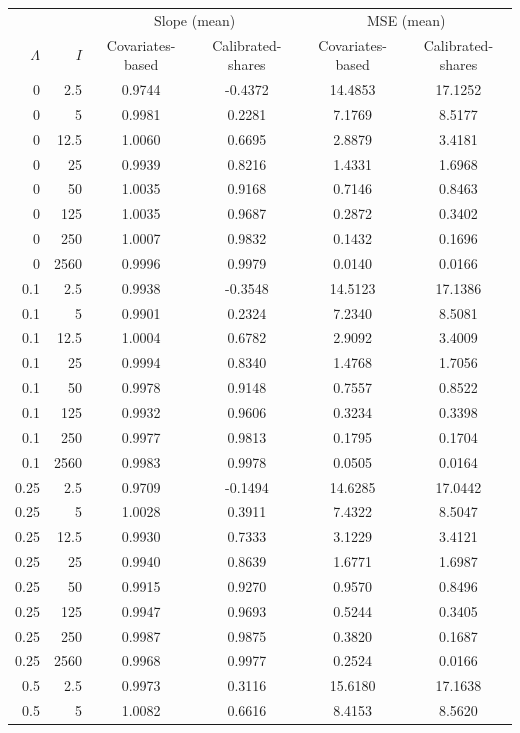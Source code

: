 \begin{tabular}{rrcccc}
\toprule
& & \multicolumn{2}{c}{Slope (mean)} & \multicolumn{2}{c}{MSE (mean)} \\
 $\Lambda$ & $I$ & Covariates-based & Calibrated-shares & Covariates-based & Calibrated-shares\\
\midrule
 0 & 2.5 & 0.9744 & -0.4372 & 14.4853 & 17.1252\\
0 & 5 & 0.9981 & 0.2281 & 7.1769 & 8.5177\\
0 & 12.5 & 1.0060 & 0.6695 & 2.8879 & 3.4181\\
0 & 25 & 0.9939 & 0.8216 & 1.4331 & 1.6968\\
0 & 50 & 1.0035 & 0.9168 & 0.7146 & 0.8463\\
0 & 125 & 1.0035 & 0.9687 & 0.2872 & 0.3402\\
0 & 250 & 1.0007 & 0.9832 & 0.1432 & 0.1696\\
0 & 2560 & 0.9996 & 0.9979 & 0.0140 & 0.0166\\
\midrule
0.1 & 2.5 & 0.9938 & -0.3548 & 14.5123 & 17.1386\\
0.1 & 5 & 0.9901 & 0.2324 & 7.2340 & 8.5081\\
0.1 & 12.5 & 1.0004 & 0.6782 & 2.9092 & 3.4009\\
0.1 & 25 & 0.9994 & 0.8340 & 1.4768 & 1.7056\\
0.1 & 50 & 0.9978 & 0.9148 & 0.7557 & 0.8522\\
0.1 & 125 & 0.9932 & 0.9606 & 0.3234 & 0.3398\\
0.1 & 250 & 0.9977 & 0.9813 & 0.1795 & 0.1704\\
0.1 & 2560 & 0.9983 & 0.9978 & 0.0505 & 0.0164\\
\midrule
0.25 & 2.5 & 0.9709 & -0.1494 & 14.6285 & 17.0442\\
0.25 & 5 & 1.0028 & 0.3911 & 7.4322 & 8.5047\\
0.25 & 12.5 & 0.9930 & 0.7333 & 3.1229 & 3.4121\\
0.25 & 25 & 0.9940 & 0.8639 & 1.6771 & 1.6987\\
0.25 & 50 & 0.9915 & 0.9270 & 0.9570 & 0.8496\\
0.25 & 125 & 0.9947 & 0.9693 & 0.5244 & 0.3405\\
0.25 & 250 & 0.9987 & 0.9875 & 0.3820 & 0.1687\\
0.25 & 2560 & 0.9968 & 0.9977 & 0.2524 & 0.0166\\
\midrule
0.5 & 2.5 & 0.9973 & 0.3116 & 15.6180 & 17.1638\\
0.5 & 5 & 1.0082 & 0.6616 & 8.4153 & 8.5620\\

\end{tabular}
